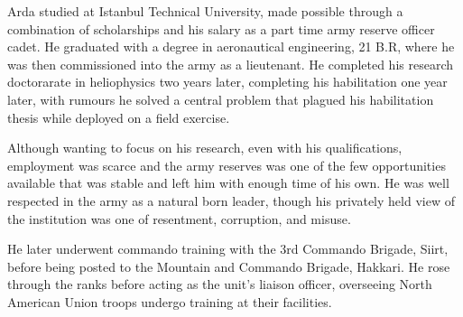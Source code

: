 Arda studied at Istanbul Technical University, made possible through a combination of scholarships and his salary as a part time army reserve officer cadet. He graduated with a degree in aeronautical engineering, 21 B.R, where he was then commissioned into the army as a lieutenant. He completed his research doctorarate in heliophysics two years later, completing his habilitation one year later, with rumours he solved a central problem that plagued his habilitation thesis while deployed on a field exercise.

Although wanting to focus on his research, even with his qualifications, employment was scarce and the army reserves was one of the few opportunities available that was stable and left him with enough time of his own. He was well respected in the army as a natural born leader, though his privately held view of the institution was one of resentment, corruption, and misuse.

He later underwent commando training with the 3rd Commando Brigade, Siirt, before being posted to the Mountain and Commando Brigade, Hakkari. He rose through the ranks before acting as the unit's liaison officer, overseeing North American Union troops undergo training at their facilities.

